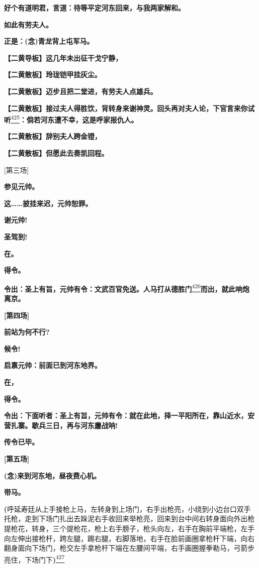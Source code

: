 \textbf{好个有道明君，言道：待等平定河东回来，与我两家解和。}

\textbf{如此有劳夫人。}

\textbf{正是：(念)青龙背上屯军马。}

\textbf{【二黄导板】这几年未出征干戈宁静，}

\textbf{【二黄散板】玲珑铠甲挂灰尘。}

\textbf{【二黄散板】迈步且把二堂进，有劳夫人点雄兵。}

\textbf{【二黄散板】接过夫人得胜饮，背转身来谢神灵。回头再对夫人论，下官言来你试听}\protect\hyperlink{fn425}{\textsuperscript{425}}\textbf{：倘若河东遭不幸，这是呼家报仇人。}

\textbf{【二黄散板】辞别夫人跨金镫，}

\textbf{【二黄散板】但愿此去奏凯回程。}

{[}第三场{]}

\textbf{参见元帅。}

\textbf{这\ldots{}\ldots{}披挂来迟，元帅恕罪。}

\textbf{谢元帅!}

\textbf{圣驾到!}

\textbf{在。}

\textbf{得令。}

\textbf{令出：圣上有旨，元帅有令：文武百官免送。人马打从德胜门}\protect\hyperlink{fn426}{\textsuperscript{426}}\textbf{而出，就此响炮离京。}

\textbf{{[}第四场{]}}

\textbf{前站为何不行?}

\textbf{候令!}

\textbf{启禀元帅：前面已到河东地界。}

\textbf{在，}

\textbf{得令。}

\textbf{令出：下面听者：圣上有旨，元帅有令：就在此地，择一平阳所在，靠山近水，安营扎寨。歇兵三日，再与河东鏖战呐!}

\textbf{传令已毕。}

\textbf{{[}第五场{]}}

\textbf{(念)来到河东地，昼夜费心机。}

\textbf{带马。}

\textbf{(}呼延寿廷从上手接枪上马，左转身到上场门，右手出枪亮，小绕到小边台口双手托枪，走到下场门扎出去跺泥右手收回来举枪亮，回来到台中间右转身面向外出枪提枪花，转身，三个提枪花，枪上右手膀子，枪头向左，右手在胸前平端枪，左手向左伸出接枪杆，跨左腿，踢右腿，右脚落地，右手在脸前画圈拿枪杆下端，向右翻身面向下场门，枪交左手拿枪杆下端在左腰间平端，右手画圈握拳勒马，弓箭步亮住，下场门下\textbf{)}\protect\hyperlink{fn427}{\textsuperscript{427}}


